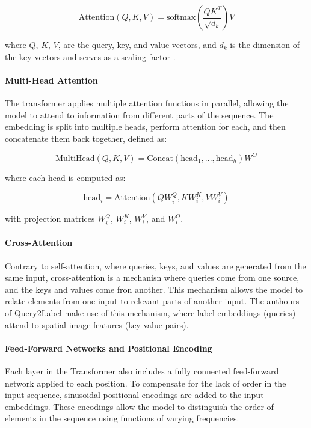 \documentclass[lettersize,journal]{IEEEtran}
\begin{document}
\begin{equation}
    \text{Attention}(Q,K,V) = \text{softmax}\left(\frac{QK^T}{\sqrt{d_k}}\right)V
\end{equation}

\noindent where $Q$, $K$, $V$, are the query, key, and value vectors, and $d_k$ is the dimension of the key vectors and serves as a scaling factor \cite{vaswani2023attentionneed}. 

\paragraph{Multi-Head Attention}
The transformer applies multiple attention functions in parallel, allowing the model to attend to information from different parts of the sequence. The embedding is split into multiple heads, perform attention for each, and then concatenate them back together, defined as:

\begin{equation}
    \text{MultiHead}(Q,K,V) = \text{Concat}(\text{head}_1, ..., \text{head}_h)W^O
\end{equation}
    
\noindent where each head is computed as:

\begin{equation}
    \text{head}_i = \text{Attention}(QW^Q_i, KW^K_i, VW^V_i)
\end{equation}

\noindent with projection matrices $W_i^Q$, $W_i^K$, $W_i^V$, and $W_i^O$.

\paragraph{Cross-Attention}
Contrary to self-attention, where queries, keys, and values are generated from the same input, cross-attention is a mechanisn where queries come from one source, and the keys and values come fron another. This mechanism allows the model to relate elements from one input to relevant parts of another input. The authours of Query2Label \cite{Query2Label} make use of this mechanism, where label embeddings (queries) attend to spatial image features (key-value pairs).

\paragraph{Feed-Forward Networks and Positional Encoding}
Each layer in the Transformer also includes a fully connected feed-forward network applied to each position. To compensate for the lack of order in the input sequence, sinusoidal positional encodings are added to the input embeddings. These encodings allow the model to distinguish the order of elements in the sequence using functions of varying frequencies.
\end{document}
